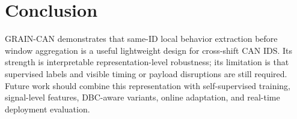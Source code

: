 \documentclass[runningheads]{llncs}
\newcommand{\method}{GRAIN-CAN}
\begin{document}
\section{Conclusion}
\method{} demonstrates that same-ID local behavior extraction before window aggregation is a useful lightweight design for cross-shift CAN IDS. Its strength is interpretable representation-level robustness; its limitation is that supervised labels and visible timing or payload disruptions are still required. Future work should combine this representation with self-supervised training, signal-level features, DBC-aware variants, online adaptation, and real-time deployment evaluation.



\end{document}
